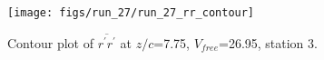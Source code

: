 \begin{figure}[H]
\centering
\texttt{[image: figs/run\_27/run\_27\_rr\_contour]}
\caption{Contour plot of $\overline{r^\prime r^\prime}$ at $z/c$=7.75, $V_{free}$=26.95, station 3.}
\label{fig:run_27_rr_contour}
\end{figure}


